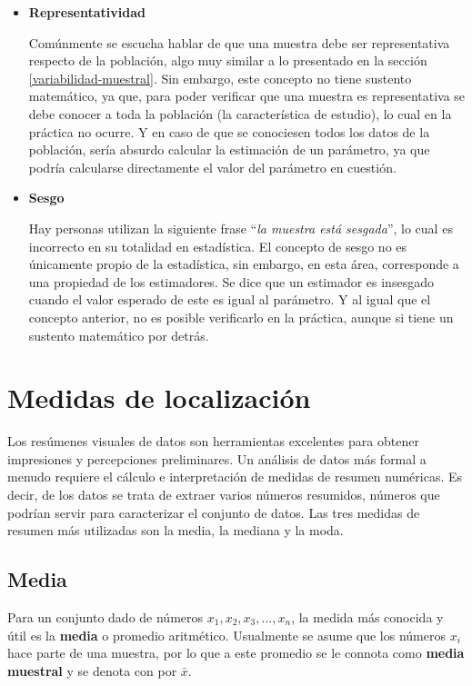 \documentclass[
  11pt,
]{book}
\theoremstyle{definition}
\theoremstyle{definition}
\theoremstyle{definition}
\theoremstyle{definition}
\theoremstyle{remark}
\begin{document}
\begin{itemize}
\item
  \textbf{Representatividad}

  Comúnmente se escucha hablar de que una muestra debe ser representativa respecto de la población, algo muy similar a lo presentado en la sección \ref{variabilidad-muestral}. Sin embargo, este concepto no tiene sustento matemático, ya que, para poder verificar que una muestra es representativa se debe conocer a toda la población (la característica de estudio), lo cual en la práctica no ocurre. Y en caso de que se conociesen todos los datos de la población, sería absurdo calcular la estimación de un parámetro, ya que podría calcularse directamente el valor del parámetro en cuestión.
\item
  \textbf{Sesgo}

  Hay personas utilizan la siguiente frase ``\emph{la muestra está sesgada}'', lo cual es incorrecto en su totalidad en estadística. El concepto de sesgo no es únicamente propio de la estadística, sin embargo, en esta área, corresponde a una propiedad de los estimadores. Se dice que un estimador es insesgado cuando el valor esperado de este es igual al parámetro. Y al igual que el concepto anterior, no es posible verificarlo en la práctica, aunque si tiene un sustento matemático por detrás.
\end{itemize}

\section{Medidas de localización}\label{topicos-medidas-localizacion}

Los resúmenes visuales de datos son herramientas excelentes para obtener impresiones y percepciones preliminares. Un análisis de datos más formal a menudo requiere el cálculo e interpretación de medidas de resumen numéricas. Es decir, de los datos se trata de extraer varios números resumidos, números que podrían servir para caracterizar el conjunto de datos. Las tres medidas de resumen más utilizadas son la media, la mediana y la moda.

\subsection{Media}\label{topicos-medidas-localizacion-media}

Para un conjunto dado de números \(x_1, x_2, x_3, \ldots, x_n\), la medida más conocida y útil es la \textbf{media} o promedio aritmético. Usualmente se asume que los números \(x_i\) hace parte de una muestra, por lo que a este promedio se le connota como \textbf{media muestral} y se denota con por \(\bar{x}\).
\end{document}

